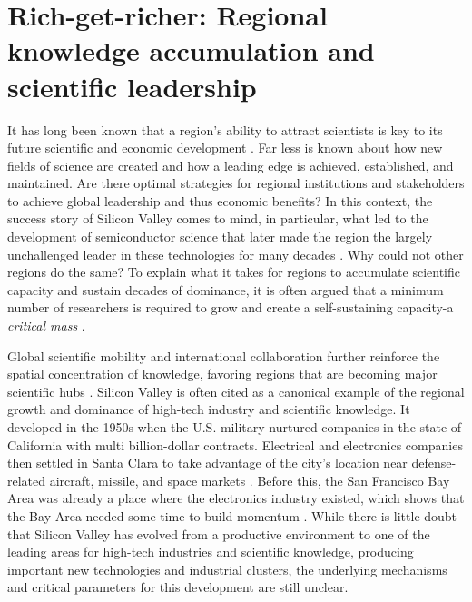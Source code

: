 \documentclass[draft,final]{vutinfth} %
\begin{document}


\chapter{Rich-get-richer: Regional knowledge accumulation and scientific leadership}
It has long been known that a region's ability to attract scientists is key to its future scientific and economic development \cite{Gibbons74}. Far less is known about how new fields of science are created and how a leading edge is achieved, established, and maintained. Are there optimal strategies for regional institutions and stakeholders to achieve global leadership and thus economic benefits? In this context, the success story of Silicon Valley comes to mind, in particular, what led to the development of semiconductor science that later made the region the largely unchallenged leader in these technologies for many decades \cite{saxenian1983genesis}. Why could not other regions do the same? To explain what it takes for regions to accumulate scientific capacity and sustain decades of dominance, it is often argued that a minimum number of researchers is required to grow and create a self-sustaining capacity-a {\em critical mass} \cite{harrison2009does,johnston1994effects}.

Global scientific mobility and international collaboration \cite{sugimoto2017scientists} further reinforce the spatial concentration of knowledge, favoring regions that are becoming major scientific hubs \cite{trippl2009islands}. Silicon Valley is often cited as a canonical example of the regional growth and dominance of high-tech industry and scientific knowledge. It developed in the 1950s when the U.S. military nurtured companies in the state of California with multi billion-dollar contracts. Electrical and electronics companies then settled in Santa Clara to take advantage of the city's location near defense-related aircraft, missile, and space markets \cite{saxenian1983genesis}. Before this, the San Francisco Bay Area was already a place where the electronics industry existed, which shows that the Bay Area needed some time to build momentum \cite{sturgeon2000silicon}. While there is little doubt that Silicon Valley has evolved from a productive environment to one of the leading areas for high-tech industries and scientific knowledge, producing important new technologies and industrial clusters, the underlying mechanisms and critical parameters for this development are still unclear.
\end{document}
